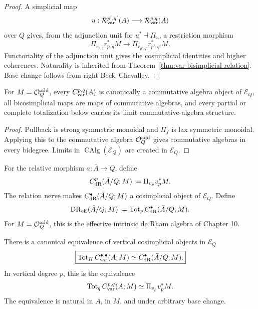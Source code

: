 \begin{proof}
A simplicial map
\[
    u:\mathcal R_{\mathrm{var}}^{p',q'}(A)\longrightarrow\mathcal R_{\mathrm{var}}^{p,q}(A)
\]
over \(Q\) gives, from the adjunction unit for \(u^*\dashv\Pi_u\), a restriction morphism
\[
    \Pi_{r_{p,q}}r_{p,q}^*M
    \longrightarrow
    \Pi_{r_{p',q'}}r_{p',q'}^*M.
\]
Functoriality of the adjunction unit gives the cosimplicial identities and higher coherences. Naturality is inherited from Theorem~\ref{thm:var-bisimplicial-relation}. Base change follows from right Beck--Chevalley.
\end{proof}

\begin{proposition}
\label{prop:var-double-algebra}
For \(M=\mathcal O^{\mathrm{add}}_Q\), every \(C_{\mathrm{var}}^{p,q}(A)\) is canonically a commutative algebra object of \(\mathcal E_Q\), all bicosimplicial maps are maps of commutative algebras, and every partial or complete totalization below carries its limit commutative-algebra structure.
\end{proposition}

\begin{proof}
Pullback is strong symmetric monoidal and \(\Pi_f\) is lax symmetric monoidal. Applying this to the commutative algebra \(\mathcal O^{\mathrm{add}}_Q\) gives commutative algebras in every bidegree. Limits in \(\operatorname{CAlg}(\mathcal E_Q)\) are created in \(\mathcal E_Q\).
\end{proof}

\begin{definition}
\label{def:var-coefficient-dr}
For the relative morphism \(a:\bar A\to Q\), define
\[
    C_{\mathrm{dR}}^p(\bar A/Q;M)
    :=
    \Pi_{v_p}v_p^*M.
\]
The relation nerve makes \(C_{\mathrm{dR}}^{\bullet}(\bar A/Q;M)\) a cosimplicial object of \(\mathcal E_Q\). Define
\[
    \mathrm{DR}_{\mathrm{eff}}(\bar A/Q;M)
    :=
    \operatorname{Tot}_p C_{\mathrm{dR}}^{\bullet}(\bar A/Q;M).
\]
For \(M=\mathcal O^{\mathrm{add}}_Q\), this is the effective intrinsic de Rham algebra of Chapter 10.
\end{definition}

\begin{theorem}
\label{thm:var-horizontal-descent-cochains}
There is a canonical equivalence of vertical cosimplicial objects in \(\mathcal E_Q\)
\[
    \boxed{
    \operatorname{Tot}_HC_{\mathrm{var}}^{\bullet,\bullet}(A;M)
    \simeq
    C_{\mathrm{dR}}^{\bullet}(\bar A/Q;M).
    }
\]
In vertical degree \(p\), this is the equivalence
\[
    \operatorname{Tot}_qC_{\mathrm{var}}^{p,q}(A;M)
    \simeq
    \Pi_{v_p}v_p^*M.
\]
The equivalence is natural in \(A\), in \(M\), and under arbitrary base change.
\end{theorem}

